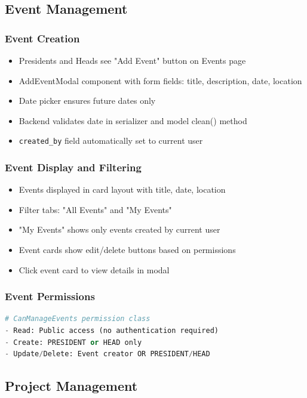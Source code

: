 \documentclass[11pt,a4paper]{article}
\begin{document}
\subsection{Event Management}

\subsubsection{Event Creation}
\begin{itemize}[leftmargin=*]
    \item Presidents and Heads see "Add Event" button on Events page
    \item AddEventModal component with form fields: title, description, date, location
    \item Date picker ensures future dates only
    \item Backend validates date in serializer and model clean() method
    \item \texttt{created\_by} field automatically set to current user
\end{itemize}

\subsubsection{Event Display and Filtering}
\begin{itemize}[leftmargin=*]
    \item Events displayed in card layout with title, date, location
    \item Filter tabs: "All Events" and "My Events"
    \item "My Events" shows only events created by current user
    \item Event cards show edit/delete buttons based on permissions
    \item Click event card to view details in modal
\end{itemize}

\subsubsection{Event Permissions}
\begin{lstlisting}[language=Python]
# CanManageEvents permission class
- Read: Public access (no authentication required)
- Create: PRESIDENT or HEAD only
- Update/Delete: Event creator OR PRESIDENT/HEAD
\end{lstlisting}

\subsection{Project Management}
\end{document}
